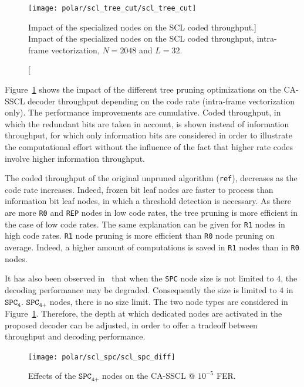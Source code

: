 \begin{figure}[htp]
  \centering
  \texttt{[image: polar/scl\_tree\_cut/scl\_tree\_cut]}
  \caption
    [Impact of the specialized nodes on the SCL coded throughput.]
    {Impact of the specialized nodes on the SCL coded throughput,
    intra-frame vectorization, $N=2048$ and $L=32$.}
  \label{plot:polar_scl_tree_cut}
\end{figure}

Figure~\ref{plot:polar_scl_tree_cut} shows the impact of the different tree
pruning optimizations on the CA-SSCL decoder throughput depending on the code
rate (intra-frame vectorization only). The performance improvements are
cumulative. Coded throughput, in which the redundant bits are taken in account,
is shown instead of information throughput, for which only information bits are
considered in order to illustrate the computational effort without the influence
of the fact that higher rate codes involve higher information throughput.

The coded throughput of the original unpruned algorithm (\verb|ref|), decreases
as the code rate increases. Indeed, frozen bit leaf nodes are faster to process
than information bit leaf nodes, in which a threshold detection is necessary. As
there are more \verb|R0| and \verb|REP| nodes in low code rates, the tree
pruning is more efficient in the case of low code rates. The same explanation
can be given for \verb|R1| nodes in high code rates. \verb|R1| node pruning is
more efficient than \verb|R0| node pruning on average. Indeed, a higher amount
of computations is saved in \verb|R1| nodes than in \verb|R0| nodes.

It has also been observed in~\cite{Sarkis2016} that when the \verb|SPC| node
size is not limited to $4$, the decoding performance may be degraded.
Consequently the size is limited to $4$ in $\texttt{SPC}_\texttt{4}$.
$\texttt{SPC}_\texttt{4+}$ nodes, there is no size limit. The two node types are
considered in Figure~\ref{plot:polar_scl_tree_cut}. Therefore, the depth at
which dedicated nodes are activated in the proposed decoder can be adjusted, in
order to offer a tradeoff between throughput and decoding performance.

\begin{figure}[htp]
  \centering
  \texttt{[image: polar/scl\_spc/scl\_spc\_diff]}
  \caption{Effects of the $\texttt{SPC}_\texttt{4+}$ nodes on the CA-SSCL @
    $10^{-5}$ FER.}
  \label{plot:polar_scl_spc}
\end{figure}

